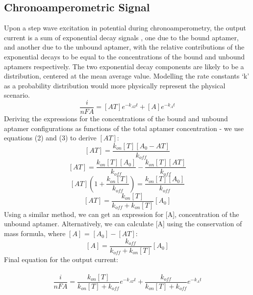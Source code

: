 \begin{appendices}
\subsection{Chronoamperometric Signal}
Upon a step wave excitation in potential during chronoamperometry, the output current is a sum of exponential decay signals \cite{arroyo2018subsecond}, one due to the bound aptamer, and another due to the unbound aptamer, with the relative contributions of the exponential decays to be equal to the concentrations of the bound and unbound aptamers respectively. The two exponential decay components are likely to be a distribution, centered at the mean average value. Modelling the rate constants `k' as a probability distribution would more physically represent the physical scenario.
$$ \frac{i}{nFA} = [AT]e^{-k_{AT}t} + [A]e^{-k_{A}t} $$
Deriving the expressions for the concentrations of the bound and unbound aptamer configurations as functions of the total aptamer concentration - we use equations (2) and (3) to derive $[AT]$:
$$ [AT] = \frac{k_{on}[T][A_{0}-AT]}{k_{off}} $$
$$ [AT] = \frac{k_{on}[T][A_{0}]}{k_{off}} - \frac{k_{on}[T][AT]}{k_{off}} $$
$$ [AT](1+\frac{k_{on}[T]}{k_{off}}) = \frac{k_{on}[T][A_{0}]}{k_{off}} $$
$$  [AT] = \frac{k_{on}[T]}{k_{off}+k_{on}[T]}[A_{0}] $$
Using a similar method, we can get an expression for [A], concentration of the unbound aptamer. Alternatively, we can calculate [A] using the conservation of mass formula, where $[A]$ = $[A_{0}]-[AT]$:
$$ [A] = \frac{k_{off}}{k_{off}+k_{on}[T]}[A_{0}] $$
Final equation for the output current:\\\\
\begin{equation}
\frac{i}{nFA} = \frac{k_{on}[T]}{k_{on}[T]+k_{off}}e^{-k_{AT}t} + \frac{k_{off}}{k_{on}[T]+k_{off}}e^{-k_{A}t}
\end{equation}

\end{appendices}

